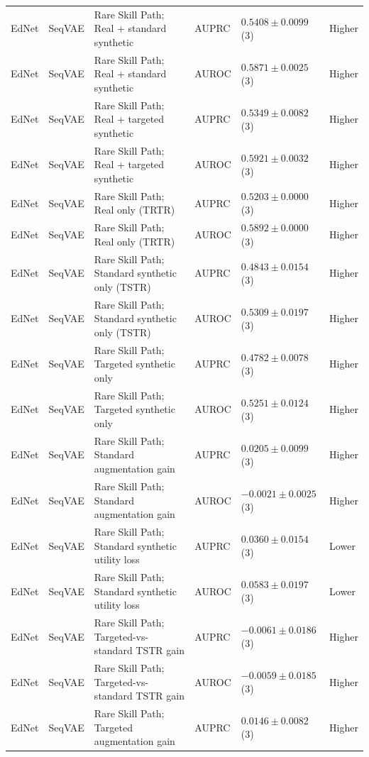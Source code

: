 \begin{longtable}{@{}p{2.25cm}p{2.05cm}p{4.7cm}p{5.0cm}p{2.6cm}p{1.25cm}@{}}
EdNet & SeqVAE & Rare Skill Path; Real + standard synthetic & AUPRC & $0.5408 \mathbin{\pm} 0.0099$ (3) & Higher \\
EdNet & SeqVAE & Rare Skill Path; Real + standard synthetic & AUROC & $0.5871 \mathbin{\pm} 0.0025$ (3) & Higher \\
EdNet & SeqVAE & Rare Skill Path; Real + targeted synthetic & AUPRC & $0.5349 \mathbin{\pm} 0.0082$ (3) & Higher \\
EdNet & SeqVAE & Rare Skill Path; Real + targeted synthetic & AUROC & $0.5921 \mathbin{\pm} 0.0032$ (3) & Higher \\
EdNet & SeqVAE & Rare Skill Path; Real only (TRTR) & AUPRC & $0.5203 \mathbin{\pm} 0.0000$ (3) & Higher \\
EdNet & SeqVAE & Rare Skill Path; Real only (TRTR) & AUROC & $0.5892 \mathbin{\pm} 0.0000$ (3) & Higher \\
EdNet & SeqVAE & Rare Skill Path; Standard synthetic only (TSTR) & AUPRC & $0.4843 \mathbin{\pm} 0.0154$ (3) & Higher \\
EdNet & SeqVAE & Rare Skill Path; Standard synthetic only (TSTR) & AUROC & $0.5309 \mathbin{\pm} 0.0197$ (3) & Higher \\
EdNet & SeqVAE & Rare Skill Path; Targeted synthetic only & AUPRC & $0.4782 \mathbin{\pm} 0.0078$ (3) & Higher \\
EdNet & SeqVAE & Rare Skill Path; Targeted synthetic only & AUROC & $0.5251 \mathbin{\pm} 0.0124$ (3) & Higher \\
EdNet & SeqVAE & Rare Skill Path; Standard augmentation gain & AUPRC & $0.0205 \mathbin{\pm} 0.0099$ (3) & Higher \\
EdNet & SeqVAE & Rare Skill Path; Standard augmentation gain & AUROC & $-0.0021 \mathbin{\pm} 0.0025$ (3) & Higher \\
EdNet & SeqVAE & Rare Skill Path; Standard synthetic utility loss & AUPRC & $0.0360 \mathbin{\pm} 0.0154$ (3) & Lower \\
EdNet & SeqVAE & Rare Skill Path; Standard synthetic utility loss & AUROC & $0.0583 \mathbin{\pm} 0.0197$ (3) & Lower \\
EdNet & SeqVAE & Rare Skill Path; Targeted-vs-standard TSTR gain & AUPRC & $-0.0061 \mathbin{\pm} 0.0186$ (3) & Higher \\
EdNet & SeqVAE & Rare Skill Path; Targeted-vs-standard TSTR gain & AUROC & $-0.0059 \mathbin{\pm} 0.0185$ (3) & Higher \\
EdNet & SeqVAE & Rare Skill Path; Targeted augmentation gain & AUPRC & $0.0146 \mathbin{\pm} 0.0082$ (3) & Higher \\

\end{longtable}
